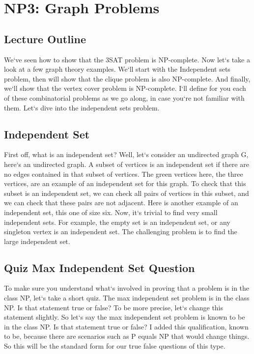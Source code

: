 \section{NP3: Graph Problems}

\subsection{Lecture Outline}
We`ve seen how to show that the 3SAT problem is NP-complete.
Now let`s take a look at a few graph theory examples.
We`ll start with the Independent sets problem, then will show that the clique problem is also NP-complete.
And finally, we`ll show that the vertex cover problem is NP-complete.
I`ll define for you each of these combinatorial problems as we go along, in case you`re not familiar with them.
Let`s dive into the independent sets problem.

\subsection{Independent Set}
First off, what is an independent set? Well, let`s consider an undirected graph G, here`s an undirected graph.
A subset of vertices is an independent set if there are no edges contained in that subset of vertices.
The green vertices here, the three vertices, are an example of an independent set for this graph.
To check that this subset is an independent set, we can check all pairs of vertices in this subset, and we can check that these pairs are not adjacent.
Here is another example of an independent set, this one of size six.
Now, it`s trivial to find very small independent sets.
For example, the empty set is an independent set, or any singleton vertex is an independent set.
The challenging problem is to find the large independent set.

\subsection{Quiz  Max Independent Set Question}
To make sure you understand what`s involved in proving that a problem is in the class NP, let`s take a short quiz.
The max independent set problem is in the class NP\@.
Is that statement true or false? To be more precise, let`s change this statement slightly.
So let`s say the max independent set problem is known to be in the class NP\@.
Is that statement true or false? I added this qualification, known to be, because there are scenarios such as P equals NP that would change things.
So this will be the standard form for our true false questions of this type.

